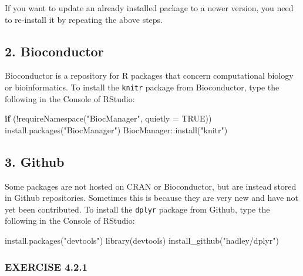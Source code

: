 \documentclass[
]{book}
\newenvironment{Shaded}{\begin{snugshade}}{\end{snugshade}}
\newcommand{\AttributeTok}[1]{\textcolor[rgb]{0.77,0.63,0.00}{#1}}
\newcommand{\ConstantTok}[1]{\textcolor[rgb]{0.00,0.00,0.00}{#1}}
\newcommand{\ControlFlowTok}[1]{\textcolor[rgb]{0.13,0.29,0.53}{\textbf{#1}}}
\newcommand{\FunctionTok}[1]{\textcolor[rgb]{0.00,0.00,0.00}{#1}}
\newcommand{\NormalTok}[1]{#1}
\newcommand{\SpecialCharTok}[1]{\textcolor[rgb]{0.00,0.00,0.00}{#1}}
\newcommand{\StringTok}[1]{\textcolor[rgb]{0.31,0.60,0.02}{#1}}
\begin{document}
If you want to update an already installed package to a newer version, you need to re-install it by repeating the above steps.

\hypertarget{bioconductor}{%
\subsection*{2. Bioconductor}\label{bioconductor}}

Bioconductor is a repository for R packages that concern computational biology or bioinformatics. To install the \texttt{knitr} package from Bioconductor, type the following in the Console of RStudio:

\begin{Shaded}
\begin{Highlighting}[]
\ControlFlowTok{if}\NormalTok{ (}\SpecialCharTok{!}\FunctionTok{requireNamespace}\NormalTok{(}\StringTok{"BiocManager"}\NormalTok{, }\AttributeTok{quietly =} \ConstantTok{TRUE}\NormalTok{))}
    \FunctionTok{install.packages}\NormalTok{(}\StringTok{"BiocManager"}\NormalTok{)}
\NormalTok{BiocManager}\SpecialCharTok{::}\FunctionTok{install}\NormalTok{(}\StringTok{"knitr"}\NormalTok{)}
\end{Highlighting}
\end{Shaded}

\hypertarget{github}{%
\subsection*{3. Github}\label{github}}

Some packages are not hosted on CRAN or Bioconductor, but are instead stored in Github repositories. Sometimes this is because they are very new and have not yet been contributed. To install the \texttt{dplyr} package from Github, type the following in the Console of RStudio:

\begin{Shaded}
\begin{Highlighting}[]
\FunctionTok{install.packages}\NormalTok{(}\StringTok{"devtools"}\NormalTok{)}
\FunctionTok{library}\NormalTok{(devtools)}
\FunctionTok{install\_github}\NormalTok{(}\StringTok{"hadley/dplyr"}\NormalTok{)}
\end{Highlighting}
\end{Shaded}

\hypertarget{exercise-4.2.1}{%
\subsubsection*{EXERCISE 4.2.1}\label{exercise-4.2.1}}
\end{document}
